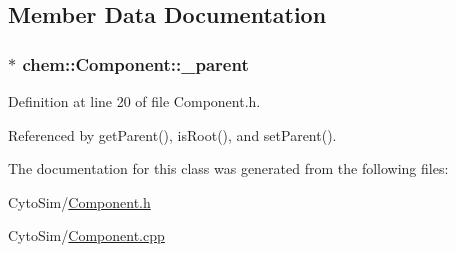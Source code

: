 \subsection{Member Data Documentation}
\hypertarget{classchem_1_1Component_a5da4c5a0d857620fe3e3cf7d8d06ec26}{
\subsubsection[{\-\_\-parent}]{$\ast$ {\bf chem\-::\-Component\-::\-\_\-parent}}}\label{classchem_1_1Component_a5da4c5a0d857620fe3e3cf7d8d06ec26}


Definition at line 20 of file Component.\-h.



Referenced by get\-Parent(), is\-Root(), and set\-Parent().



The documentation for this class was generated from the following files\-:\begin{DoxyCompactItemize}
\item 
Cyto\-Sim/\hyperlink{Component_8h}{Component.\-h}\item 
Cyto\-Sim/\hyperlink{Component_8cpp}{Component.\-cpp}\end{DoxyCompactItemize}
